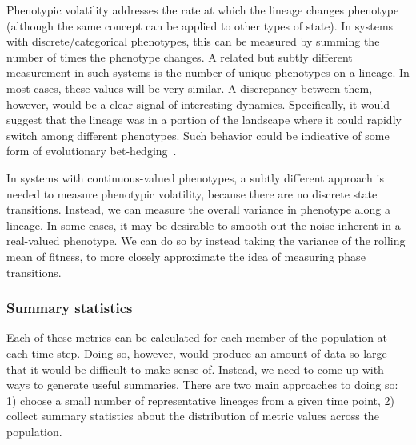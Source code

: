 \documentclass[letterpaper]{article}
\begin{document}
Phenotypic volatility addresses the rate at which the lineage changes phenotype (although the same concept can be applied to other types of state). In systems with discrete/categorical phenotypes, this can be measured by summing the number of times the phenotype changes. A related but subtly different measurement in such systems is the number of unique phenotypes on a lineage. In most cases, these values will be very similar. A discrepancy between them, however, would be a clear signal of interesting dynamics. Specifically, it would suggest that the lineage was in a portion of the landscape where it could rapidly switch among different phenotypes. Such behavior could be indicative of some form of evolutionary bet-hedging~\citep{beaumont2009experimental}. %

In systems with continuous-valued phenotypes, a subtly different approach is needed to measure phenotypic volatility, because there are no discrete state transitions. Instead, we can measure the overall variance in phenotype along a lineage. In some cases, it may be desirable to smooth out the noise inherent in a real-valued phenotype. We can do so by instead taking the variance of the rolling mean of fitness, to more closely approximate the idea of measuring phase transitions.




\subsubsection{Summary statistics}

Each of these metrics can be calculated for each member of the population at each time step. Doing so, however, would produce an amount of data so large that it would be difficult to make sense of. Instead, we need to come up with ways to generate useful summaries. There are two main approaches to doing so: 1) choose a small number of representative lineages from a given time point, 2) collect summary statistics about the distribution of metric values across the population.
\end{document}
